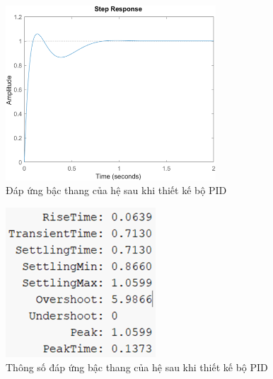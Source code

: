     \begin{figure}[H]
        \centering
        \includegraphics[width=0.7\textwidth]{pictures/PID.png} %
        \caption{Đáp ứng bậc thang của hệ sau khi thiết kế bộ PID}
    \end{figure}
    \begin{figure}[H]
        \centering
        \includegraphics[width=0.5\textwidth]{pictures/specification.png} %
        \caption{Thông số đáp ứng bậc thang của hệ sau khi thiết kế bộ PID}
    \end{figure}

